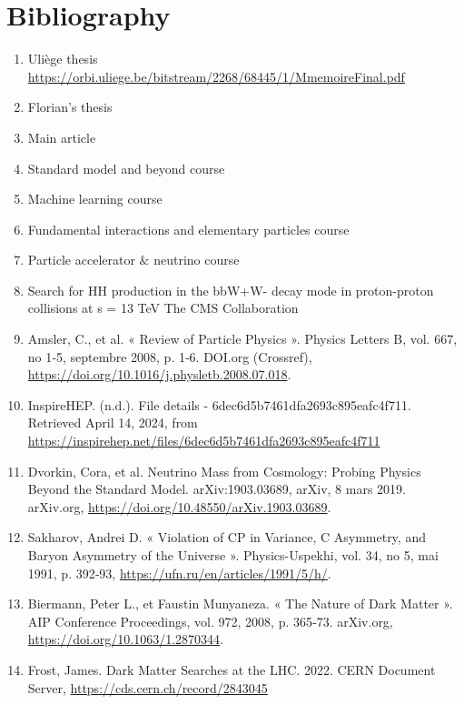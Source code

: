 \documentclass [12pt] {article}
\numberwithin{equation}{section} %
\numberwithin{figure}{section}   %
\begin{document}
\section{Bibliography}
\begin{enumerate}
    \item Uliège thesis \url{https://orbi.uliege.be/bitstream/2268/68445/1/MmemoireFinal.pdf} \label{uliege}
    \item Florian's thesis
    \item Main article
    \item Standard model and beyond course
    \item Machine learning course
    \item Fundamental interactions and elementary particles course
    \item Particle accelerator $\&$ neutrino course
    \item Search for HH production in the bbW+W- decay mode in proton-proton collisions at s = 13 TeV The CMS Collaboration \label{Agni bbww}
    \item Amsler, C., et al. « Review of Particle Physics ». Physics Letters B, vol. 667, no 1‑5, septembre 2008, p. 1‑6. DOI.org (Crossref), \url{https://doi.org/10.1016/j.physletb.2008.07.018}. \label{vev}
    \item InspireHEP. (n.d.). File details - 6dec6d5b7461dfa2693c895eafc4f711. Retrieved April 14, 2024, from \url{https://inspirehep.net/files/6dec6d5b7461dfa2693c895eafc4f711} \label{higgs decay}
    \item Dvorkin, Cora, et al. Neutrino Mass from Cosmology: Probing Physics Beyond the Standard Model. arXiv:1903.03689, arXiv, 8 mars 2019. arXiv.org, \url{https://doi.org/10.48550/arXiv.1903.03689}. \label{neutrino mass}
    \item Sakharov, Andrei D. « Violation of CP in Variance, C Asymmetry, and Baryon Asymmetry of the Universe ». Physics-Uspekhi, vol. 34, no 5, mai 1991, p. 392‑93, \url{https://ufn.ru/en/articles/1991/5/h/}. \label{Sakharov}
    \item Biermann, Peter L., et Faustin Munyaneza. « The Nature of Dark Matter ». AIP Conference Proceedings, vol. 972, 2008, p. 365‑73. arXiv.org, \url{https://doi.org/10.1063/1.2870344}. \label{cold DM}
    \item Frost, James. Dark Matter Searches at the LHC. 2022. CERN Document Server, \url{https://cds.cern.ch/record/2843045} \label{DM1}

\end{enumerate}
\end{document}
